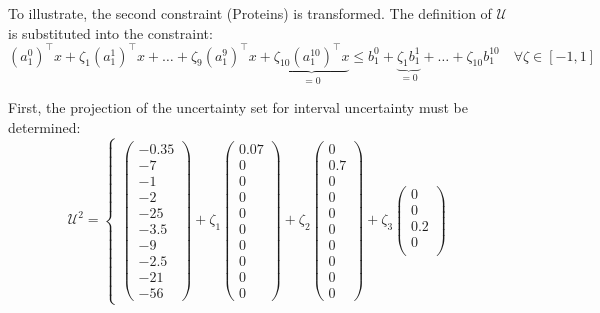 \documentclass[a4paper,12pt]{article}
\begin{document}
To illustrate, the second constraint (Proteins) is transformed.
The definition of $\mathcal{U}$ is substituted into the constraint:
\[
(a_1^0)^\top x + \zeta_1 (a_1^1)^\top x + \dots + \zeta_9 (a_1^9)^\top x + \underbrace{\zeta_{10} (a_1^{10})^\top x}_{= 0} \leq b_1^0 + \underbrace{\zeta_1 b_1^1}_{=0} + \dots +\zeta_{10} b_1^{10} \quad \forall \zeta \in [-1, 1]
\]

First, the projection of the uncertainty set for interval uncertainty must be determined:
\[
\mathcal{U}^{2} = \left\{ 
\begin{array}{l}
    \begin{pmatrix}
    -0.35 \\ 
    -7 \\ 
    -1 \\
    -2 \\
    -25 \\
    -3.5 \\
    -9 \\
    -2.5 \\
    -21 \\
    -56
    \end{pmatrix}
    + \zeta_1 
    \begin{pmatrix}
    0.07 \\ 
    0 \\ 
    0 \\
    0 \\
    0 \\
    0 \\
    0 \\
    0 \\
    0 \\
    0
    \end{pmatrix}
    + \zeta_2 
    \begin{pmatrix}
    0 \\ 
    0.7 \\ 
    0 \\
    0 \\
    0 \\
    0 \\
    0 \\
    0 \\
    0 \\
    0
    \end{pmatrix}
    + \zeta_3 
    \begin{pmatrix}
    0 \\ 
    0 \\ 
    0.2 \\
    0 \\ 

\end{pmatrix}
\end{array}\]
\end{document}
